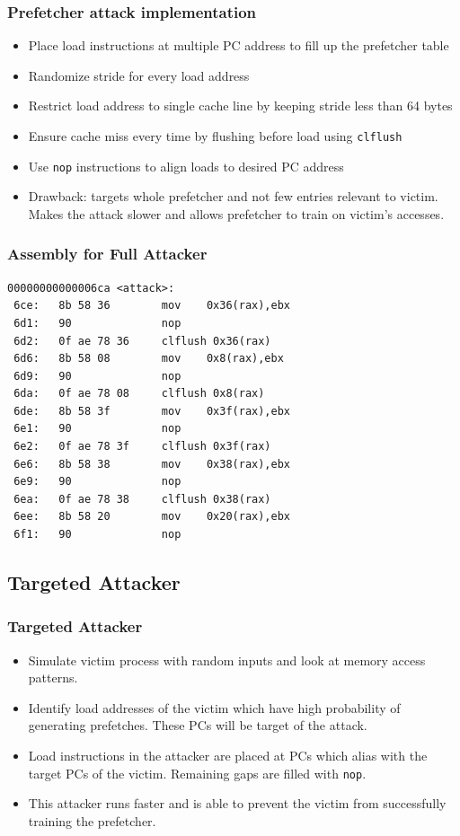 \documentclass[10pt]{beamer}
\begin{document}
\begin{frame}
\frametitle{Prefetcher attack implementation}
\begin{itemize}
    \item Place load instructions at multiple PC address to fill up the prefetcher table
    \item Randomize stride for every load address
    \item Restrict load address to single cache line by keeping stride less than 64 bytes
    \item Ensure cache miss every time by flushing before load using \texttt{clflush}
    \item Use \texttt{nop} instructions to align loads to desired PC address
    \vspace{2em}
    \item Drawback: targets whole prefetcher and not few entries relevant to victim.
        Makes the attack slower and allows prefetcher to train on victim's accesses.
\end{itemize}
\end{frame}

\begin{frame}[fragile]
\frametitle{Assembly for Full Attacker}
\begin{lstlisting}[caption={Assembly showing load misses at different PCs},
label={lst:full_attack}]
00000000000006ca <attack>:
 6ce:   8b 58 36        mov    0x36(rax),ebx
 6d1:   90              nop
 6d2:   0f ae 78 36     clflush 0x36(rax)
 6d6:   8b 58 08        mov    0x8(rax),ebx
 6d9:   90              nop
 6da:   0f ae 78 08     clflush 0x8(rax)
 6de:   8b 58 3f        mov    0x3f(rax),ebx
 6e1:   90              nop
 6e2:   0f ae 78 3f     clflush 0x3f(rax)
 6e6:   8b 58 38        mov    0x38(rax),ebx
 6e9:   90              nop
 6ea:   0f ae 78 38     clflush 0x38(rax)
 6ee:   8b 58 20        mov    0x20(rax),ebx
 6f1:   90              nop
\end{lstlisting}
\end{frame}

\subsection{Targeted Attacker}

\begin{frame}
\frametitle{Targeted Attacker}
\begin{itemize}
    \item Simulate victim process with random inputs and look at memory access patterns.
    \item Identify load addresses of the victim which have high probability
        of generating prefetches. These PCs will be target of the attack.
    \item Load instructions in the attacker are placed at PCs which alias with the target
        PCs of the victim. Remaining gaps are filled with \texttt{nop}.
    \item This attacker runs faster and is able to prevent the victim from successfully
        training the prefetcher.
\end{itemize}
\end{frame}
\end{document}

